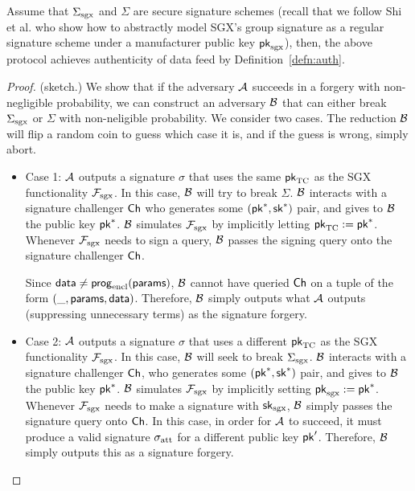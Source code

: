 \begin{theorem}[Authenticity]
Assume that ${\Sigma_{\textrm{sgx}}}$
and $\Sigma$ are secure signature schemes (recall
that we follow Shi et al.  who show
how to abstractly  
model SGX's group signature as a regular signature
scheme under a manufacturer public key ${\sf pk}_{\mathrm{sgx}}$),
then, the above 
protocol achieves authenticity of data feed by Definition~\ref{defn:auth}.
\end{theorem}
\begin{proof} (sketch.)
We show that if the 
adversary $\mathcal{A}$ succeeds in a forgery with non-negligible probability,
we can construct an adversary $\mathcal{B}$ that can either
break ${\Sigma_{\textrm{sgx}}}$ or $\Sigma$ with non-neligible probability.
We consider two cases. 
The reduction $\mathcal{B}$ will flip a random coin to guess which
case it is, and if the guess is wrong, simply abort.
\begin{itemize}[leftmargin=5mm]
\item
Case 1: $\mathcal{A}$ outputs a signature $\sigma$ that uses the same  
${\sf pk}_{\textrm{TC}}$ as the SGX functionality $\mathcal{F}_{\textrm{sgx}}$.
In this case, $\mathcal{B}$ will try to break $\Sigma$. 
$\mathcal{B}$ interacts with a signature challenger ${\sf Ch}$ who generates
some $({\sf pk}^*, {\sf sk}^*)$ pair, and gives to $\mathcal{B}$ the public key
${\sf pk}^*$. $\mathcal{B}$ simulates 
$\mathcal{F}_{\textrm{sgx}}$ by implicitly letting ${\sf pk}_{\textrm{TC}} := {\sf pk}^*$.
Whenever $\mathcal{F}_{\textrm{sgx}}$ needs to sign a query, $\mathcal{B}$ passes the signing query
onto the signature challenger ${\sf Ch}$.

Since ${\sf data} \neq {\sf prog}_{\textrm{encl}}({\sf params})$,
$\mathcal{B}$ cannot have queried ${\sf Ch}$  
on a tuple of the form $(\_, {\sf params}, {\sf data})$. 
Therefore, $\mathcal{B}$ simply outputs 
what $\mathcal{A}$ 
outputs (suppressing unnecessary terms) as the signature forgery. 

\item
Case 2:
 $\mathcal{A}$ outputs a signature $\sigma$ that uses a different 
${\sf pk}_{\textrm{TC}}$ as the SGX functionality $\mathcal{F}_{\textrm{sgx}}$.
In this case, $\mathcal{B}$ will seek to break ${\Sigma_{\textrm{sgx}}}$.
$\mathcal{B}$ interacts with a signature challenger ${\sf Ch}$, who generates
some $({\sf pk}^*, {\sf sk}^*)$ pair, and gives to $\mathcal{B}$ the public key
${\sf pk}^*$. $\mathcal{B}$ simulates $\mathcal{F}_{\textrm{sgx}}$ by implicitly setting
${\sf pk}_{\mathrm{sgx}} := {\sf pk}^*$.
Whenever $\mathcal{F}_{\textrm{sgx}}$ needs to make a signature
with ${\sf sk}_{\mathrm{sgx}}$, 
$\mathcal{B}$ simply passes the signature query onto ${\sf Ch}$.
In this case, in order for $\mathcal{A}$ to succeed,
it must produce a valid signature ${\sigma_{\textrm{att}}}$ 
for a different public key ${\sf pk}'$.
Therefore, $\mathcal{B}$ simply outputs this as a signature forgery.
\end{itemize}
\end{proof}




